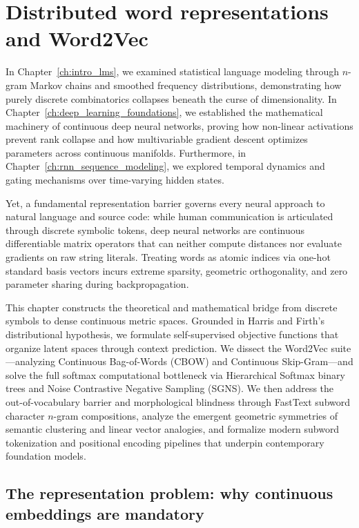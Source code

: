 \documentclass[../../main.tex]{subfiles}
\begin{document}
\chapter{Distributed word representations and Word2Vec}
\label{ch:word_embeddings}

In Chapter~\ref{ch:intro_lms}, we examined statistical language modeling through $n$-gram Markov chains and smoothed frequency distributions, demonstrating how purely discrete combinatorics collapses beneath the curse of dimensionality. In Chapter~\ref{ch:deep_learning_foundations}, we established the mathematical machinery of continuous deep neural networks, proving how non-linear activations prevent rank collapse and how multivariable gradient descent optimizes parameters across continuous manifolds. Furthermore, in Chapter~\ref{ch:rnn_sequence_modeling}, we explored temporal dynamics and gating mechanisms over time-varying hidden states.

Yet, a fundamental representation barrier governs every neural approach to natural language and source code: while human communication is articulated through discrete symbolic tokens, deep neural networks are continuous differentiable matrix operators that can neither compute distances nor evaluate gradients on raw string literals. Treating words as atomic indices via one-hot standard basis vectors incurs extreme sparsity, geometric orthogonality, and zero parameter sharing during backpropagation.

This chapter constructs the theoretical and mathematical bridge from discrete symbols to dense continuous metric spaces. Grounded in Harris and Firth's distributional hypothesis, we formulate self-supervised objective functions that organize latent spaces through context prediction. We dissect the Word2Vec suite---analyzing Continuous Bag-of-Words (CBOW) and Continuous Skip-Gram---and solve the full softmax computational bottleneck via Hierarchical Softmax binary trees and Noise Contrastive Negative Sampling (SGNS). We then address the out-of-vocabulary barrier and morphological blindness through FastText subword character $n$-gram compositions, analyze the emergent geometric symmetries of semantic clustering and linear vector analogies, and formalize modern subword tokenization and positional encoding pipelines that underpin contemporary foundation models.

\clearpage
\section{The representation problem: why continuous embeddings are mandatory}
\label{sec:representation_problem}
\end{document}
